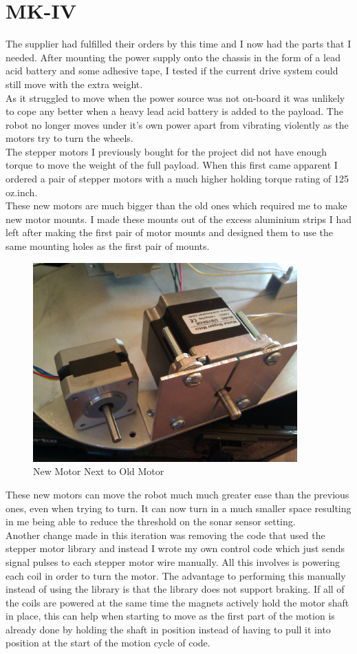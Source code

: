 \section{MK-IV}
The supplier had fulfilled their orders by this time and I now had the parts that I needed.  After mounting the power supply onto the chassis in the form of a lead acid battery and some adhesive tape, I tested if the current drive system could still move with the extra weight.
\\As it struggled to move when the power source was not on-board it was unlikely to cope any better when a heavy lead acid battery is added to the payload.  The robot no longer moves under it's own power apart from vibrating violently as the motors try to turn the wheels.
\\The stepper motors I previously bought for the project did not have enough torque to move the weight of the full payload.  When this first came apparent I ordered a pair of stepper motors with a much higher holding torque rating of 125 oz.inch.
\\These new motors are much bigger than the old ones which required me to make new motor mounts.  I made these mounts out of the excess aluminium strips I had left after making the first pair of motor mounts and designed them to use the same mounting holes as the first pair of mounts.
\begin{figure}[H]
\centering
        \includegraphics[width=4.0in]  {Images/motor-compare.jpg}
        \caption{New Motor Next to Old Motor}
        \label{New Motor Next to Old Motor}
\end{figure}
These new motors can move the robot much much greater ease than the previous ones, even when trying to turn.  It can now turn in a much smaller space resulting in me being able to reduce the threshold on the sonar sensor setting.
\\Another change made in this iteration was removing the code that used the stepper motor library and instead I wrote my own control code which just sends signal pulses to each stepper motor wire manually.  All this involves is powering each coil in order to turn the motor.  The advantage to performing this manually instead of using the library is that the library does not support braking.  If all of the coils are powered at the same time the magnets actively hold the motor shaft in place, this can help when starting to move as the first part of the motion is already done by holding the shaft in position instead of having to pull it into position at the start of the motion cycle of code.
